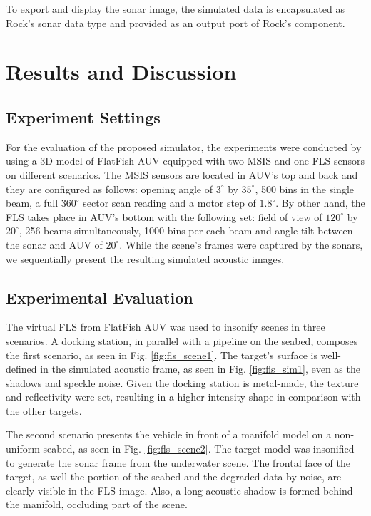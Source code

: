 \documentclass[final,5p,times]{elsarticle}
\begin{document}
To export and display the sonar image, the simulated data is encapsulated as Rock's sonar data type and provided as an output port of Rock's component.


\section{Results and Discussion}
\label{results}

\subsection{Experiment Settings}

For the evaluation of the proposed simulator, the experiments were conducted by using a 3D model of FlatFish AUV equipped with two MSIS and one FLS sensors on different scenarios. The MSIS sensors are located in AUV's top and back and they are configured as follows: opening angle of $3^{\circ}$ by $35^{\circ}$, 500 bins in the single beam, a full $360^{\circ}$ sector scan reading and a motor step of $1.8^{\circ}$. By other hand, the FLS takes place in AUV's bottom with the following set: field of view of $120^{\circ}$ by $20^{\circ}$, 256 beams simultaneously, 1000 bins per each beam and angle tilt between the sonar and AUV of $20^{\circ}$. While the scene's frames were captured by the sonars, we sequentially present the resulting simulated acoustic images.

\subsection{Experimental Evaluation}

The virtual FLS from FlatFish AUV was used to insonify scenes in three scenarios. A docking station, in parallel with a pipeline on the seabed, composes the first scenario, as seen in Fig. \ref{fig:fls_scene1}. The target's surface is well-defined in the simulated acoustic frame, as seen in Fig. \ref{fig:fls_sim1}, even as the shadows and speckle noise. Given the docking station is metal-made, the texture and reflectivity were set, resulting in a higher intensity shape in comparison with the other targets.

The second scenario presents the vehicle in front of a manifold model on a non-uniform seabed, as seen in Fig. \ref{fig:fls_scene2}. The target model was insonified to generate the sonar frame from the underwater scene. The frontal face of the target, as well the portion of the seabed and the degraded data by noise, are clearly visible in the FLS image. Also, a long acoustic shadow is formed behind the manifold, occluding part of the scene.
\end{document}
